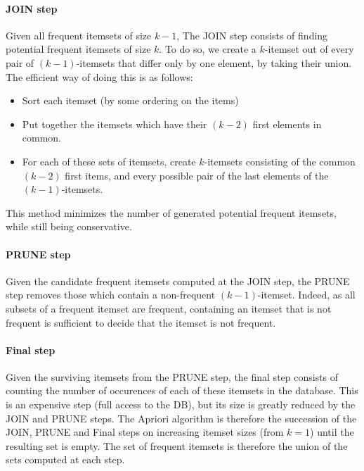 \paragraph{JOIN step}
Given all frequent itemsets of size $k-1$, The JOIN step consists of finding potential frequent itemsets of size $k$.
To do so, we create a $k$-itemset out of every pair of $(k-1)$-itemsets that differ only by one element, by taking their union.
The efficient way of doing this is as follows:
\begin{itemize}
\item Sort each itemset (by some ordering on the items)
\item Put together the itemsets which have their $(k-2)$ first elements in common.
\item For each of these sets of itemsets, create $k$-itemsets consisting of the common $(k-2)$ first items, and every possible pair of the last elements of the $(k-1)$-itemsets.
\end{itemize}
This method minimizes the number of generated potential frequent itemsets, while still being conservative.

\paragraph{PRUNE step}
Given the candidate frequent itemsets computed at the JOIN step, the PRUNE step removes those which contain a non-frequent $(k-1)$-itemset.
Indeed, as all subsets of a frequent itemset are frequent, containing an itemset that is not frequent is sufficient to decide that the itemset is not frequent.

\paragraph{Final step}
Given the surviving itemsets from the PRUNE step, the final step consists of counting the number of occurences of each of these itemsets in the database.
This is an expensive step (full access to the DB), but its size is greatly reduced by the JOIN and PRUNE steps.
The Apriori algorithm is therefore the succession of the JOIN, PRUNE and Final steps on increasing itemset sizes (from $k = 1$) until the resulting set is empty. The set of frequent itemsets is therefore the union of the sets computed at each step.

